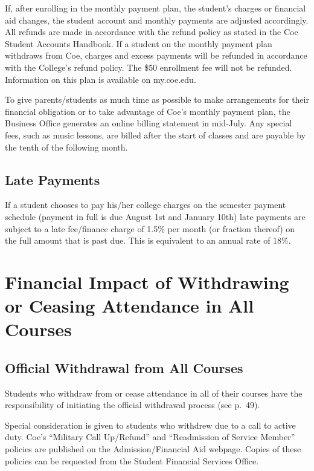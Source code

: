 \documentclass[
  letterpaper,
]{scrbook}
\begin{document}
If, after enrolling in the monthly payment plan, the student's charges
or financial aid changes, the student account and monthly payments are
adjusted accordingly. All refunds are made in accordance with the refund
policy as stated in the Coe Student Accounts Handbook. If a student on
the monthly payment plan withdraws from Coe, charges and excess payments
will be refunded in accordance with the College's refund policy. The
\$50 enrollment fee will not be refunded. Information on this plan is
available on my.coe.edu.

To give parents/students as much time as possible to make arrangements
for their financial obligation or to take advantage of Coe's monthly
payment plan, the Business Office generates an online billing statement
in mid-July. Any special fees, such as music lessons, are billed after
the start of classes and are payable by the tenth of the following
month.

\subsection{Late Payments}\label{late-payments}

If a student chooses to pay his/her college charges on the semester
payment schedule (payment in full is due August 1st and January 10th)
late payments are subject to a late fee/finance charge of 1.5\% per
month (or fraction thereof) on the full amount that is past due. This is
equivalent to an annual rate of 18\%.

\section{Financial Impact of Withdrawing or Ceasing Attendance in All
Courses}\label{financial-impact-of-withdrawing-or-ceasing-attendance-in-all-courses}

\subsection{Official Withdrawal from All
Courses}\label{official-withdrawal-from-all-courses}

Students who withdraw from or cease attendance in all of their courses
have the responsibility of initiating the official withdrawal process
(see p.~49).

Special consideration is given to students who withdrew due to a call to
active duty. Coe's ``Military Call Up/Refund'' and ``Readmission of
Service Member'' policies are published on the Admission/Financial Aid
webpage. Copies of these policies can be requested from the Student
Financial Services Office.
\end{document}
